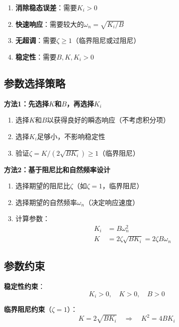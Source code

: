 \documentclass[12pt,a4paper]{article}
\begin{document}
\begin{enumerate}
\item \textbf{消除稳态误差}：需要$K_i > 0$
\item \textbf{快速响应}：需要较大的$\omega_n = \sqrt{K_i/B}$
\item \textbf{无超调}：需要$\zeta \geq 1$（临界阻尼或过阻尼）
\item \textbf{稳定性}：需要$B, K, K_i > 0$
\end{enumerate}

\subsection{参数选择策略}

\textbf{方法1：先选择$K$和$B$，再选择$K_i$}

\begin{enumerate}
\item 选择$K$和$B$以获得良好的瞬态响应（不考虑积分项）
\item 选择$K_i$足够小，不影响稳定性
\item 验证$\zeta = K/(2\sqrt{BK_i}) \geq 1$（临界阻尼）
\end{enumerate}

\textbf{方法2：基于阻尼比和自然频率设计}

\begin{enumerate}
\item 选择期望的阻尼比$\zeta$（如$\zeta = 1$，临界阻尼）
\item 选择期望的自然频率$\omega_n$（决定响应速度）
\item 计算参数：
\begin{align}
K_i &= B\omega_n^2 \\
K &= 2\zeta\sqrt{BK_i} = 2\zeta B\omega_n
\end{align}
\end{enumerate}

\subsection{参数约束}

\textbf{稳定性约束}：
\begin{equation}
K_i > 0, \quad K > 0, \quad B > 0
\end{equation}

\textbf{临界阻尼约束}（$\zeta = 1$）：
\begin{equation}
K = 2\sqrt{BK_i} \quad \Rightarrow \quad K^2 = 4BK_i
\end{equation}
\end{document}
